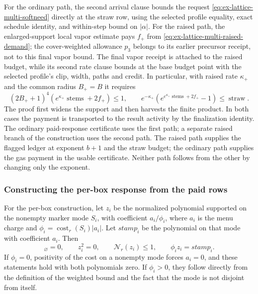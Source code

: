 For the ordinary path, the second arrival clause bounds the request
\eqref{eq:ex-lattice-multi-softneed} directly at the straw row, using the
selected profile equality, exact schedule identity, and within-step bound on
$|\alpha|$. For the raised path, the enlarged-support local vapor estimate pays
$f_+$ from \eqref{eq:ex-lattice-multi-raised-demand}; the
cover-weighted allowance $p_3$ belongs to its earlier precursor receipt,
not to this final vapor bound. The final vapor receipt is attached to the
raised budget, while its second rate clause bounds at the base budget point
with the selected profile's clip, width, paths and credit. In particular,
with raised rate $\kappa_+$ and the common radius $B_+=B$ it requires
\[
 (2B_++1)^4(e^{\kappa_+}\operatorname{stems}+2f_+)\leq1,
 \qquad e^{-\kappa_+}(e^{e^{\kappa_+}\operatorname{stems}+2f_+}-1)
       \leq\operatorname{straw}.
\]
The proof first widens the support and then harvests the finite product. In
both cases the payment is transported to the result activity by the
finalization identity.
The ordinary paid-response certificate uses the first path; a separate
raised branch of the construction uses the second path. The raised path supplies the flagged ledger at exponent $b+1$ and the straw budget; the ordinary path supplies the gas payment in the usable certificate. Neither path follows from
the other by changing only the exponent.

\subsubsection{Constructing the per-box response from the paid rows}
\label{subsec:ex-lattice-rg-canopy}

For the per-box construction, let $z_i$ be the normalized polynomial
supported on the nonempty marker mode $S_i$, with coefficient $a_i/\phi_i$,
where $a_i$ is the menu charge and $\phi_i=\operatorname{cost}_r(S_i)|a_i|$.
Let $stamp_i$ be the polynomial on that mode with coefficient $a_i$. Then
\begin{equation}
 [z_i]_{\varnothing}=0,\qquad z_i^2=0,\qquad
 \mathcal N_r(z_i)\leq1,\qquad \phi_i z_i=stamp_i.
 \label{eq:ex-lattice-menu-singleton}
\end{equation}
If $\phi_i=0$, positivity of the cost on a nonempty mode forces $a_i=0$,
and these statements hold with both polynomials zero. If $\phi_i>0$, they
follow directly from the definition of the weighted bound and the fact that
the mode is not disjoint from itself.

